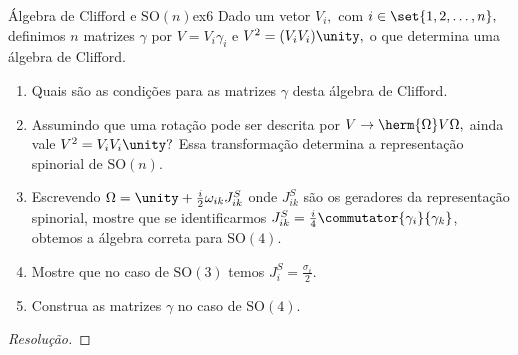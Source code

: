 \begin{exercício}{Álgebra de Clifford e \(\mathrm{SO}(n)\)}{ex6}
    Dado um vetor \(V_i,\) com \(i \in \set{1,2,\dots, n},\) definimos \(n\) matrizes \(\gamma\) por \(V = V_i \gamma_i\) e \(V^2 = (V_i V_i) \unity,\) o que determina uma álgebra de Clifford.
    \begin{enumerate}[label=(\alph*)]
        \item Quais são as condições para as matrizes \(\gamma\) desta álgebra de Clifford.
        \item Assumindo que uma rotação pode ser descrita por \(V \to \herm{\Omega}V \Omega,\) ainda vale \(V^2 = V_i V_i \unity?\) Essa transformação determina a representação spinorial de \(\mathrm{SO}(n)\).
        \item Escrevendo \(\Omega = \unity + \frac{i}{2}\omega_{ik}J^{S}_{ik}\) onde \(J^{S}_{ik}\) são os geradores da representação spinorial, mostre que se identificarmos \(J^{S}_{ik} = \frac{i}{4}\commutator{\gamma_i}{\gamma_k}\), obtemos a álgebra correta para \(\mathrm{SO}(4).\)
        \item Mostre que no caso de \(\mathrm{SO}(3)\) temos \(J^{S}_i = \frac{\sigma_i}{2}\).
        \item Construa as matrizes \(\gamma\) no caso de \(\mathrm{SO}(4)\).
    \end{enumerate}
\end{exercício}
\begin{proof}[Resolução]
    
\end{proof}
